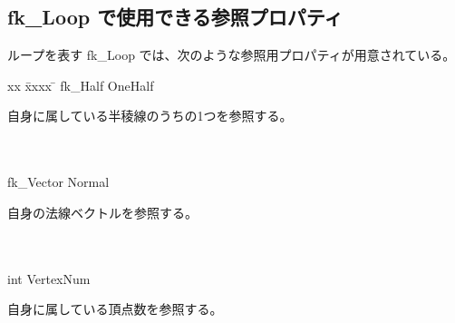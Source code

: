 \subsection{fk\_Loop で使用できる参照プロパティ}
ループを表す fk\_Loop では、次のような参照用プロパティが用意されている。
\begin{tabbing}
xx \= xxxx \= \kill
\> fk\_Half OneHalf \\
	\> \> \begin{minipage}[]{15cm}
		自身に属している半稜線のうちの1つを参照する。
	\end{minipage} \\ \\

\> fk\_Vector Normal \\
	\> \> \begin{minipage}[]{15cm}
		自身の法線ベクトルを参照する。
	\end{minipage} \\ \\

\> int VertexNum \\
	\> \> \begin{minipage}[]{15cm}
		自身に属している頂点数を参照する。
	\end{minipage}
\end{tabbing}

